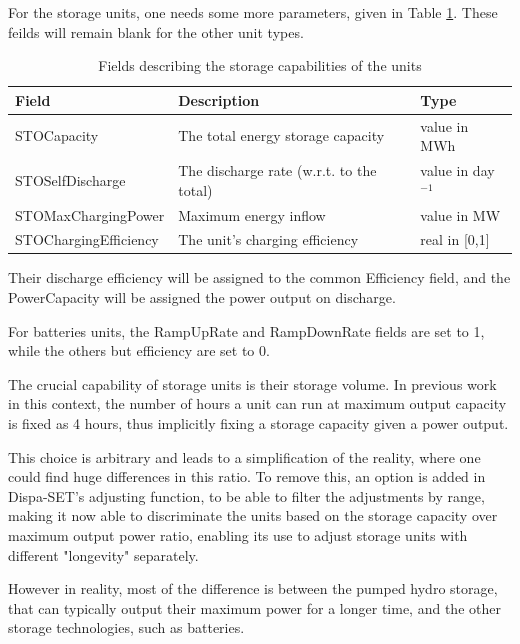 For the storage units, one needs some more parameters, given in Table \ref{table:plant-storage-db}. These feilds will remain blank for the other unit types.

\begin{table}[h]
    \centering
    \begin{tabular}{|l l l|}
        \hline
        Field                 & Description                       & Type          \\ \hline
        STOCapacity           & The total energy storage capacity & value in MWh  \\
        STOSelfDischarge      & The discharge rate (w.r.t. to the total) & value in day$^{-1}$ \\
        STOMaxChargingPower   & Maximum energy inflow             & value in MW   \\
        STOChargingEfficiency & The unit's charging efficiency    & real in [0,1] \\ \hline
    \end{tabular}
    \caption{Fields describing the storage capabilities of the units}
    \label{table:plant-storage-db}
\end{table}


Their discharge efficiency will be assigned to the common Efficiency field, and the PowerCapacity will be assigned the power output on discharge.

For batteries units, the RampUpRate and RampDownRate fields are set to 1, while the others but efficiency are set to 0. 

The crucial capability of storage units is their storage volume. In previous work in this context, the number of hours a unit can run at maximum output capacity is fixed as 4 hours, thus implicitly fixing a storage capacity given a power output.

This choice is arbitrary and leads to a simplification of the reality, where one could find huge differences in this ratio. To remove this, an option is added in Dispa-SET's adjusting function, to be able to filter the adjustments by range, making it now able to discriminate the units based on the storage capacity over maximum output power ratio, enabling its use to adjust storage units with different "longevity" separately.

However in reality, most of the difference is between the pumped hydro storage, that can typically output their maximum power for a longer time, and the other storage technologies, such as batteries.


